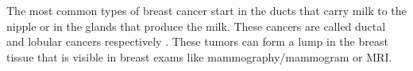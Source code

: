 \documentclass[
  twoside,
  11pt, a4paper,
  footinclude=true,
  headinclude=true,
  cleardoublepage=empty
]{scrbook}
\begin{document}
        The most common types of breast cancer start in the ducts that carry milk to the nipple or in the glands that produce the milk. These cancers are called ductal and lobular cancers respectively \cite{hunt2012diseases}. These tumors can form a lump in the breast tissue that is visible in breast exams like mammography/mammogram or MRI.

\end{document}
